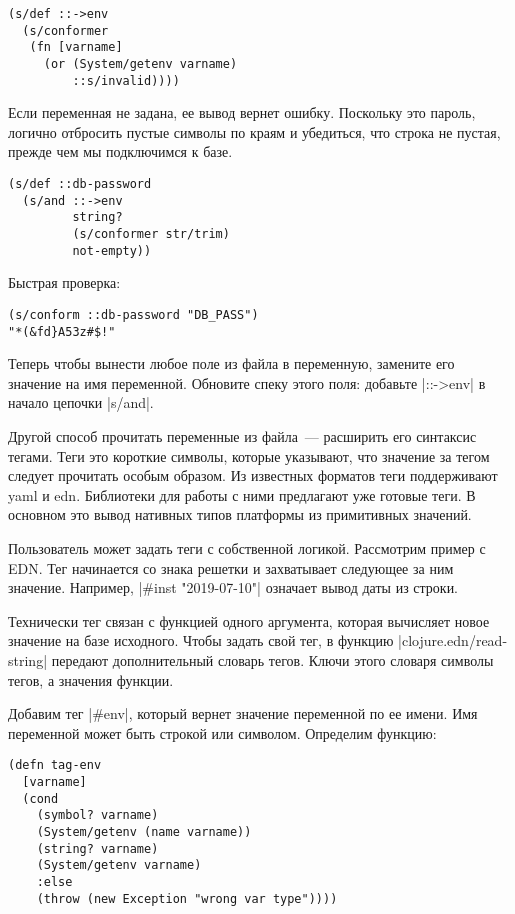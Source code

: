 \begin{verbatim}
(s/def ::->env
  (s/conformer
   (fn [varname]
     (or (System/getenv varname)
         ::s/invalid))))
\end{verbatim}

Если переменная не задана, ее вывод вернет ошибку. Поскольку это пароль, логично
отбросить пустые символы по краям и убедиться, что строка не пустая, прежде чем
мы подключимся к базе.

\begin{verbatim}
(s/def ::db-password
  (s/and ::->env
         string?
         (s/conformer str/trim)
         not-empty))
\end{verbatim}

Быстрая проверка:

\begin{verbatim}
(s/conform ::db-password "DB_PASS")
"*(&fd}A53z#$!"
\end{verbatim}

Теперь чтобы вынести любое поле из файла в переменную, замените его значение на
имя переменной. Обновите спеку этого поля: добавьте \spverb|::->env| в начало цепочки
\spverb|s/and|.

Другой способ прочитать переменные из файла~--- расширить его синтаксис
тегами. Теги это короткие символы, которые указывают, что значение за тегом
следует прочитать особым образом. Из известных форматов теги поддерживают yaml и
edn. Библиотеки для работы с ними предлагают уже готовые теги. В основном это
вывод нативных типов платформы из примитивных значений.

Пользователь может задать теги с собственной логикой. Рассмотрим пример с
EDN. Тег начинается со знака решетки и захватывает следующее за ним
значение. Например, \spverb|#inst "2019-07-10"| означает вывод даты из строки.

Технически тег связан с функцией одного аргумента, которая вычисляет новое
значение на базе исходного. Чтобы задать свой тег, в функцию
\spverb|clojure.edn/read-string| передают дополнительный словарь тегов. Ключи этого
словаря символы тегов, а значения функции.

Добавим тег \spverb|#env|, который вернет значение переменной по ее имени. Имя
переменной может быть строкой или символом. Определим функцию:

\begin{verbatim}
(defn tag-env
  [varname]
  (cond
    (symbol? varname)
    (System/getenv (name varname))
    (string? varname)
    (System/getenv varname)
    :else
    (throw (new Exception "wrong var type"))))
\end{verbatim}

